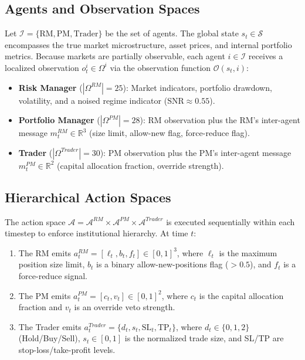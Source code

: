 \documentclass[11pt]{article}
\begin{document}
\subsection{Agents and Observation Spaces}
Let $\mathcal{I} = \{\text{RM}, \text{PM}, \text{Trader}\}$ be the set of agents. The global state $s_t \in \mathcal{S}$ encompasses the true market microstructure, asset prices, and internal portfolio metrics. Because markets are partially observable, each agent $i \in \mathcal{I}$ receives a localized observation $o_t^i \in \Omega^i$ via the observation function $\mathcal{O}(s_t, i)$:
\begin{itemize}[leftmargin=*]
    \item \textbf{Risk Manager} ($|\Omega^{RM}| = 25$): Market indicators, portfolio drawdown, volatility, and a noised regime indicator ($\text{SNR} \approx 0.55$).
    \item \textbf{Portfolio Manager} ($|\Omega^{PM}| = 28$): RM observation plus the RM's inter-agent message $m_t^{RM} \in \mathbb{R}^3$ (size limit, allow-new flag, force-reduce flag).
    \item \textbf{Trader} ($|\Omega^{Trader}| = 30$): PM observation plus the PM's inter-agent message $m_t^{PM} \in \mathbb{R}^2$ (capital allocation fraction, override strength).
\end{itemize}

\subsection{Hierarchical Action Spaces}
The action space $\mathcal{A} = \mathcal{A}^{RM} \times \mathcal{A}^{PM} \times \mathcal{A}^{Trader}$ is executed sequentially within each timestep to enforce institutional hierarchy. At time $t$:
\begin{enumerate}[leftmargin=*]
    \item The RM emits $a_t^{RM} = [\ell_t, b_t, f_t] \in [0,1]^3$, where $\ell_t$ is the maximum position size limit, $b_t$ is a binary allow-new-positions flag ($>0.5$), and $f_t$ is a force-reduce signal.
    \item The PM emits $a_t^{PM} = [c_t, v_t] \in [0,1]^2$, where $c_t$ is the capital allocation fraction and $v_t$ is an override veto strength.
    \item The Trader emits $a_t^{Trader} = \{d_t, s_t, \text{SL}_t, \text{TP}_t\}$, where $d_t \in \{0, 1, 2\}$ (Hold/Buy/Sell), $s_t \in [0,1]$ is the normalized trade size, and SL/TP are stop-loss/take-profit levels.
\end{enumerate}
\end{document}
